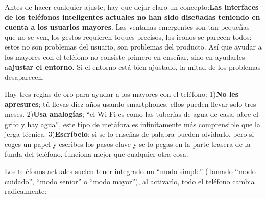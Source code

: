 


Antes de hacer cualquier ajuste, hay que dejar claro un concepto:\textbf{Las interfaces de los teléfonos inteligentes actuales no han sido diseñadas teniendo en cuenta a los usuarios mayores}. Las ventanas emergentes son tan pequeñas que no se ven, los gestos requieren toques precisos, los iconos se parecen todos: estos no son problemas del usuario, son problemas del producto. Así que ayudar a los mayores con el teléfono no consiste primero en enseñar, sino en ayudarles a\textbf{ajustar el entorno}. Si el entorno está bien ajustado, la mitad de los problemas desaparecen.

Hay tres reglas de oro para ayudar a los mayores con el teléfono: 1)\textbf{No les apresures}; tú llevas diez años usando smartphones, ellos pueden llevar solo tres meses. 2)\textbf{Usa analogías}; “el Wi-Fi es como las tuberías de agua de casa, abre el grifo y hay agua”, este tipo de metáfora es infinitamente más comprensible que la jerga técnica. 3)\textbf{Escríbelo}; si se lo enseñas de palabra pueden olvidarlo, pero si coges un papel y escribes los pasos clave y se lo pegas en la parte trasera de la funda del teléfono, funciona mejor que cualquier otra cosa.


Los teléfonos actuales suelen tener integrado un “modo simple” (llamado “modo cuidado”, “modo senior” o “modo mayor”), al activarlo, todo el teléfono cambia radicalmente:

